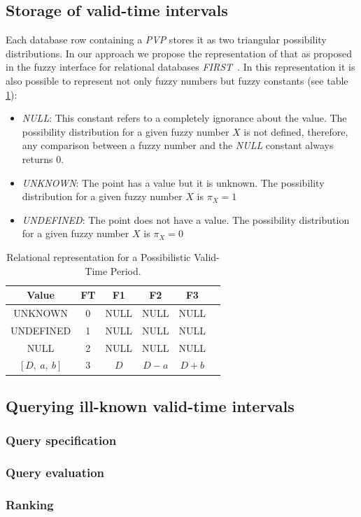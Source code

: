 \subsection{Storage of valid-time intervals}
Each database row containing a \emph{PVP} stores it as two triangular possibility distributions. In our approach we propose the representation of that as proposed in the  fuzzy interface for relational databases \emph{FIRST}~\cite{Medina94gefred.a,Gal98,Gal06}. In this representation it is also possible to represent not only fuzzy numbers but fuzzy constants (see table \ref{table:relational-representation-pvp}):

\begin{itemize}
\item
\emph{NULL}: This constant refers to a completely ignorance about the value. The possibility distribution for a given fuzzy number $X$ is not defined, therefore, any comparison between a fuzzy number and the \emph{NULL} constant always returns $0$.
\item
\emph{UNKNOWN}: The point has a value but it is unknown. The possibility distribution for a given fuzzy number $X$ is $\pi_X=1$
\item
\emph{UNDEFINED}: The point does not have a value. The possibility distribution for a given fuzzy number $X$ is $\pi_X=0$
\end{itemize}


\begin{table}
\caption{Relational representation for a Possibilistic Valid-Time Period.}
\centering
\begin{tabular}{c c c c c c}
\hline
Value & FT & F1 & F2 & F3  \\ \hline
UNKNOWN & 0 & NULL & NULL & NULL  \\ 
UNDEFINED & 1 & NULL & NULL & NULL  \\ 
NULL & 2 & NULL & NULL & NULL  \\ 
$\left[D,\ a,\ b \right]$ & 3 & $D$ & $D-a$ & $D+b$ \\ 
\hline
\end{tabular}
\label{table:relational-representation-pvp}
\end{table}

\subsection{Querying ill-known valid-time intervals}

\subsubsection{Query specification}

\subsubsection{Query evaluation}

\subsubsection{Ranking}